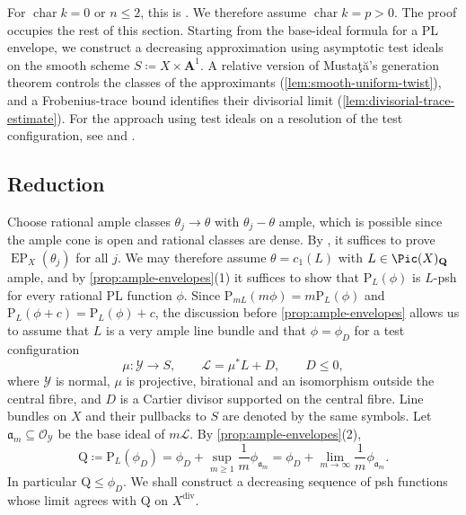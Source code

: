 \documentclass[11pt,a4paper]{article}
\newcommand{\divv}{\mathrm{div}}       %
\newcommand{\EP}{\operatorname{EP}}
\begin{document}
For $\operatorname{char}k=0$ or $n\leq2$, this is \cite[Theorem~5.20]{BJ22}. We therefore assume $\operatorname{char}k=p>0$. The proof occupies the rest of this section. Starting from the base-ideal formula for a PL envelope, we construct a decreasing approximation using asymptotic test ideals on the smooth scheme $S\coloneqq X\times\mathbf A^1$. A relative version of Musta\c{t}\u{a}'s generation theorem controls the classes of the approximants (\cref{lem:smooth-uniform-twist}), and a Frobenius-trace bound identifies their divisorial limit (\cref{lem:divisorial-trace-estimate}). For the approach using test ideals on a resolution of the test configuration, see \cite[\S2.1]{BJaddendum} and \cite{GJKM19}.

\subsection*{Reduction}

Choose rational ample classes $\theta_j\to\theta$ with $\theta_j-\theta$ ample, which is possible since the ample cone is open and rational classes are dense. By \cite[Lemma~5.9]{BJ22}, it suffices to prove $\EP_X(\theta_j)$ for all $j$. We may therefore assume $\theta=c_1(L)$ with $L\in\Pic(X)_{\mathbf Q}$ ample, and by \cref{prop:ample-envelopes}(1) it suffices to show that $\mathrm P_L(\phi)$ is $L$-psh for every rational PL function $\phi$. Since $\mathrm P_{mL}(m\phi)=m\mathrm P_L(\phi)$ and $\mathrm P_L(\phi+c)=\mathrm P_L(\phi)+c$, the discussion before \cref{prop:ample-envelopes} allows us to assume that $L$ is a very ample line bundle and that $\phi=\phi_D$ for a test configuration
\[
 \mu\colon\mathcal{Y}\longrightarrow S,
 \qquad
 \mathcal{L}=\mu^*L+D,
 \qquad D\leq0,
\]
where $\mathcal Y$ is normal, $\mu$ is projective, birational and an isomorphism outside the central fibre, and $D$ is a Cartier divisor supported on the central fibre. Line bundles on $X$ and their pullbacks to $S$ are denoted by the same symbols. Let $\mathfrak a_m\subseteq\mathcal O_{\mathcal Y}$ be the base ideal of $m\mathcal L$. By \cref{prop:ample-envelopes}(2),
\begin{equation}\label{eq:smooth-BJ-envelope}
 \mathrm Q\coloneqq\mathrm P_L(\phi_D)=\phi_D+\sup_{m\ge1}\frac1m\phi_{\mathfrak a_m}=\phi_D+\lim_{m\to\infty}\frac1m\phi_{\mathfrak a_m}.
\end{equation}
In particular $\mathrm Q\le\phi_D$. We shall construct a decreasing sequence of psh functions whose limit agrees with $\mathrm Q$ on $X^{\divv}$.
\end{document}
